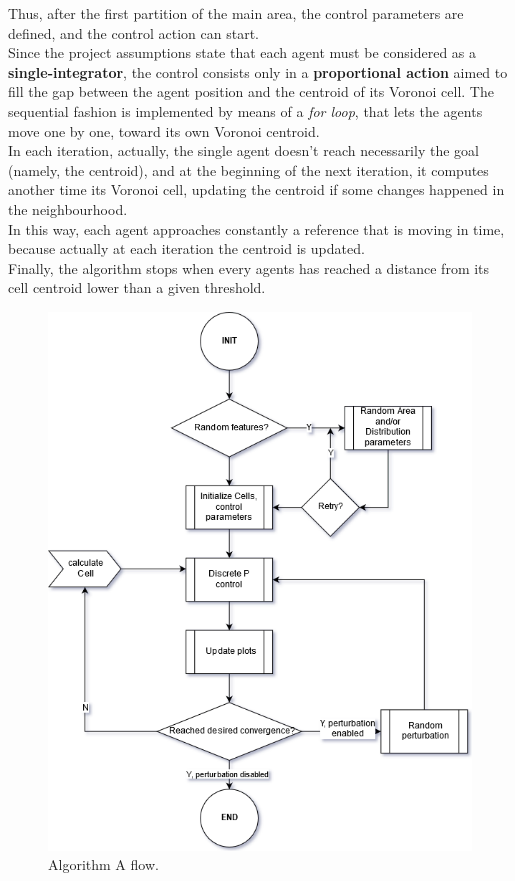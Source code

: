 \documentclass[a4paper,11pt,oneside]{book}
\begin{document}
Thus, after the first partition of the main area, the control parameters are defined, and the control action can start.\\
Since the project assumptions state that each agent must be considered as a \textbf{single-integrator}, the control consists only in a \textbf{proportional action} aimed to fill the gap between the agent position and the centroid of its Voronoi cell. The sequential fashion is implemented by means of a \textit{for loop}, that lets the agents move one by one, toward its own Voronoi centroid.\\
In each iteration, actually, the single agent doesn't reach necessarily the goal (namely, the centroid), and at the beginning of the next iteration, it computes another time its Voronoi cell, updating the centroid if some changes happened in the neighbourhood.\\
In this way, each agent approaches constantly a reference that is moving in time, because actually at each iteration the centroid is updated. \\
Finally, the algorithm stops when every agents has reached a distance from its cell centroid lower than a given threshold.\\	
	\begin{figure} [H]
		
		\centering
		
		\includegraphics[scale=0.63]{figs/algorithmA.png}
		
		\caption{Algorithm A flow.}\label{fig:algorithmA.png}
		
	\end{figure}
	
\end{document}
